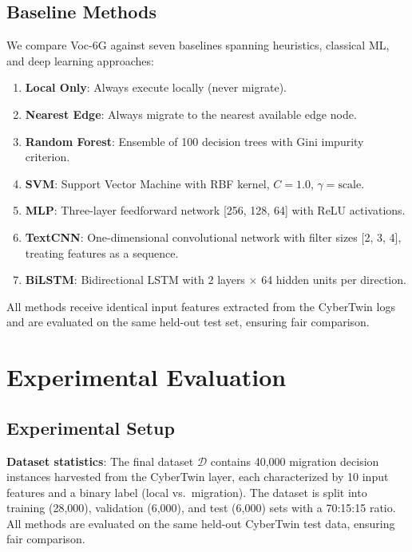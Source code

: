 \documentclass[journal,twoside]{IEEEtran}
\newcommand{\VocSixG}{Voc-6G}
\begin{document}
\subsection{Baseline Methods}

We compare \VocSixG{} against seven baselines spanning heuristics, classical ML, and deep learning approaches:

\begin{enumerate}
    \item \textbf{Local Only}: Always execute locally (never migrate).
    \item \textbf{Nearest Edge}: Always migrate to the nearest available edge node.
    \item \textbf{Random Forest}: Ensemble of 100 decision trees with Gini impurity criterion.
    \item \textbf{SVM}: Support Vector Machine with RBF kernel, $C=1.0$, $\gamma=\text{scale}$.
    \item \textbf{MLP}: Three-layer feedforward network [256, 128, 64] with ReLU activations.
    \item \textbf{TextCNN}: One-dimensional convolutional network with filter sizes [2, 3, 4], treating features as a sequence.
    \item \textbf{BiLSTM}: Bidirectional LSTM with 2 layers $\times$ 64 hidden units per direction.
\end{enumerate}

All methods receive identical input features extracted from the CyberTwin logs and are evaluated on the same held-out test set, ensuring fair comparison.


\section{Experimental Evaluation}
\label{sec:experiments}

\subsection{Experimental Setup}

\textbf{Dataset statistics}: The final dataset $\mathcal{D}$ contains 40,000 migration decision instances harvested from the CyberTwin layer, each characterized by 10 input features and a binary label (local vs.\ migration). The dataset is split into training (28,000), validation (6,000), and test (6,000) sets with a 70:15:15 ratio. All methods are evaluated on the same held-out CyberTwin test data, ensuring fair comparison.
\end{document}
